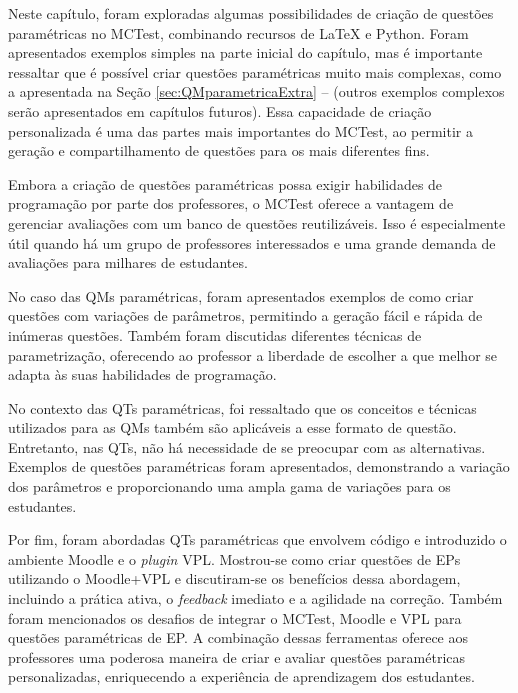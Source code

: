 Neste capítulo, foram exploradas algumas possibilidades de criação de questões paramétricas no MCTest, combinando recursos de \LaTeX{} e Python. Foram apresentados exemplos simples na parte inicial do capítulo, mas é importante ressaltar que é possível criar questões paramétricas muito mais complexas, como a apresentada na Seção \ref{sec:QMparametricaExtra} --  (outros exemplos complexos serão apresentados em capítulos futuros). Essa capacidade de criação personalizada é uma das partes mais importantes do MCTest, ao permitir a geração e compartilhamento de questões para os mais diferentes fins.


Embora a criação de questões paramétricas possa exigir habilidades de programação por parte dos professores, o MCTest oferece a vantagem de gerenciar avaliações com um banco de questões reutilizáveis. Isso é especialmente útil quando há um grupo de professores interessados e uma grande demanda de avaliações para milhares de estudantes. 

No caso das QMs paramétricas, foram apresentados exemplos de como criar questões com variações de parâmetros, permitindo a geração fácil e rápida de inúmeras questões. Também foram discutidas diferentes técnicas de parametrização, oferecendo ao professor a liberdade de escolher a que melhor se adapta às suas habilidades de programação.

No contexto das QTs paramétricas, foi ressaltado que os conceitos e técnicas utilizados para as QMs também são aplicáveis a esse formato de questão. Entretanto, nas QTs, não há necessidade de se preocupar com as alternativas. Exemplos de questões paramétricas foram apresentados, demonstrando a variação dos parâmetros e proporcionando uma ampla gama de variações para os estudantes.

Por fim, foram abordadas QTs paramétricas que envolvem código e introduzido o ambiente Moodle e o \textit{plugin} VPL. Mostrou-se como criar questões de EPs utilizando o Moodle+VPL e discutiram-se os benefícios dessa abordagem, incluindo a prática ativa, o \textit{feedback} imediato e a agilidade na correção. Também foram mencionados os desafios de integrar o MCTest, Moodle e VPL para questões paramétricas de EP. A combinação dessas ferramentas oferece aos professores uma poderosa maneira de criar e avaliar questões paramétricas personalizadas, enriquecendo a experiência de aprendizagem dos estudantes.